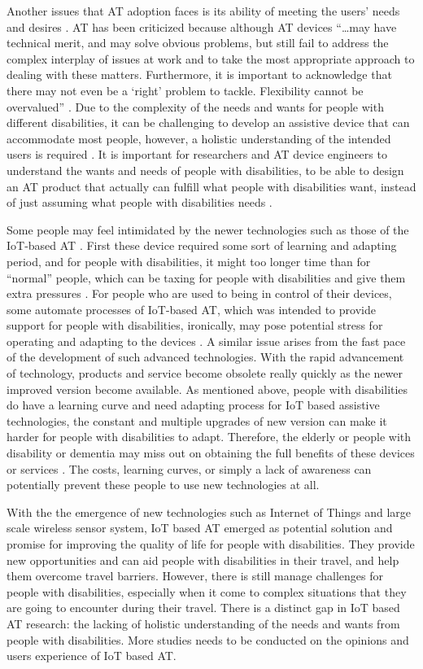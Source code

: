 Another issues that AT adoption faces is its ability of meeting the users’
needs and desires \cite{Shah}. AT has been criticized because although AT devices ``…may have
technical merit, and may solve obvious problems, but still fail to address the complex
interplay of issues at work and to take the most appropriate approach to dealing with
these matters. Furthermore, it is important to acknowledge that there may not even
be a ‘right’ problem to tackle. Flexibility cannot be overvalued'' \cite{Shah}. Due to 
the complexity of the needs and wants for people with different disabilities, it can 
be challenging to develop an assistive device that can accommodate most people, 
however, a holistic understanding of the intended users is required \cite{Shah}.
It is important for researchers and AT device engineers to understand the wants 
and needs of people with disabilities, to be able to design an AT product that 
actually can fulfill what people with disabilities want, instead of just 
assuming what people with disabilities needs \cite{Barbeau}.

Some people may feel intimidated by the newer technologies such as those of the IoT-based AT \cite{cunningham2017cloud}.
First these device required some sort of learning and adapting period, and for people with 
disabilities, it might too longer time than for ``normal'' people, which can be taxing for
people with disabilities and give them extra pressures \cite{Shah}. For people who are used to being
in control of their devices, some automate processes of IoT-based AT, which was intended to 
provide support for people with disabilities, ironically, may pose potential stress for 
operating and adapting to the devices \cite{Shah}.  A similar issue arises from the fast 
pace of the development of such advanced technologies. With the rapid advancement of 
technology, products and service become obsolete really quickly as the newer improved 
version become available. As mentioned above, people with disabilities do have a 
learning curve and need adapting process for IoT based assistive technologies, the 
constant and multiple upgrades of new version can make it harder for people with 
disabilities to adapt. Therefore, the elderly or people with disability or 
dementia may miss out on obtaining the full benefits of these devices or services \cite{Shah,Barbeau,cunningham2017cloud}.
The costs, learning curves, or simply a lack of awareness can potentially 
prevent these people to use new technologies at all.  

With the the emergence of new technologies such as Internet of Things 
and large scale wireless sensor system, IoT based AT emerged as potential 
solution and promise for improving the quality of life for people with 
disabilities. They provide new opportunities and can aid people with 
disabilities in their travel, and help them overcome travel barriers. 
However, there is still manage challenges for people with disabilities, 
especially when it come to complex situations that they are going to 
encounter during their travel. There is a distinct gap in IoT based AT 
research: the lacking of holistic understanding of the needs and wants 
from people with disabilities. More studies needs to be conducted on the 
opinions and users experience of IoT based AT. 

